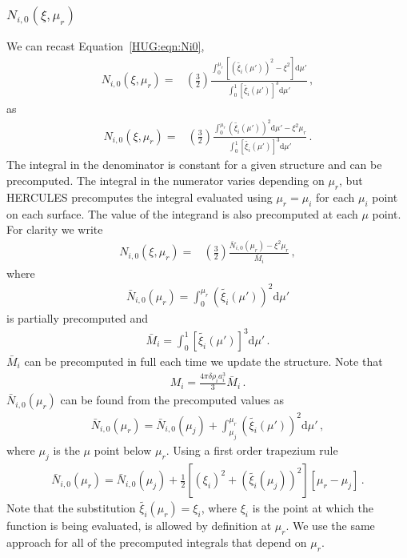 \documentclass[11pt, oneside]{article}   	%
\begin{document}
\subsubsection{\boldmath$N_{i,0}(\xi,\mu_r)$}
\label{HUG:sec:Ni0}
We can recast Equation~\ref{HUG:eqn:Ni0},
%
\begin{align}
N_{i,0}(\xi,\mu_r)  = {} & \left (  \frac{3}{2} \right ) \frac{ \int_{0}^{\mu_r} \left [ (\tilde{\xi_i}(\mu'))^2 - \xi^2 \right ] \mathrm{d}\mu' }{\int_{0}^{1} \left [ \tilde{\xi_i}(\mu') \right ]^3 \mathrm{d}\mu' } \,,
\end{align}
%
as
%
\begin{align}
N_{i,0}(\xi,\mu_r)  = {} & \left (  \frac{3}{2} \right ) \frac{ \int_{0}^{\mu_r}  (\tilde{\xi_i}(\mu'))^2   \mathrm{d}\mu' - \xi^2 \mu_r }{\int_{0}^{1} \left [ \tilde{\xi_i}(\mu') \right ]^3 \mathrm{d}\mu' } \,.
\end{align}
%
The integral in the denominator is constant for a given structure and can be precomputed.
The integral in the numerator varies depending on $\mu_r$, but HERCULES precomputes the integral evaluated using $\mu_r=\mu_i$ for each $\mu_i$ point on each surface. The value of the integrand is also precomputed at each $\mu$ point.
For clarity we write 
%
\begin{align}
N_{i,0}(\xi,\mu_r)  = {} & \left (  \frac{3}{2} \right ) \frac{ \bar{N}_{i,0}(\mu_r)- \xi^2 \mu_r }{\bar{M}_i} \,,
\end{align}
%
where
%
\begin{align}
\bar{N}_{i,0}(\mu_r)=\int_{0}^{\mu_r}  (\tilde{\xi_i}(\mu'))^2   \mathrm{d}\mu' 
\end{align}
%
is partially precomputed and
%
\begin{align}
\bar{M}_i=\int_{0}^{1} \left [ \tilde{\xi_i}(\mu') \right ]^3 \mathrm{d}\mu' \,.
\end{align}
%
$\bar{M}_i$ can be precomputed in full each time we update the structure. Note that
%
\begin{align}
M_i=\frac{4\pi \delta\rho_i a_i^3}{3} \bar{M}_i \,.
\end{align}
%
$\bar{N}_{i,0}(\mu_r)$ can be found from the precomputed values as
%
\begin{align}
\bar{N}_{i,0}(\mu_r)=\bar{N}_{i,0}(\mu_j)+\int_{\mu_j}^{\mu_r}  (\tilde{\xi_i}(\mu'))^2 \mathrm{d}\mu' \,,
\end{align}
%
where $\mu_j$ is the $\mu$ point below $\mu_r$.
Using a first order trapezium rule 
%
\begin{align}
\bar{N}_{i,0}(\mu_r)=\bar{N}_{i,0}(\mu_j)+ \frac{1}{2} \left [(\xi_i)^2 + (\tilde{\xi_i}(\mu_j))^2 \right ] \left [\mu_r-\mu_j \right ] \,.
\end{align}
%
Note that the substitution $\tilde{\xi_i}(\mu_r)=\xi_i$, where $\xi_i$ is the point at which the function is being evaluated, is allowed by definition at $\mu_r$. We use the same approach for all of the precomputed integrals that depend on $\mu_r$.
\end{document}
